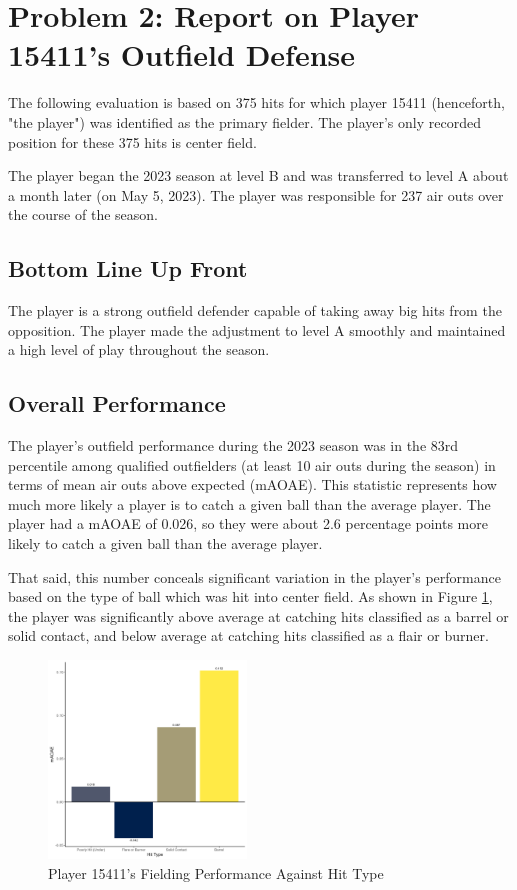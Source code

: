 
\section*{Problem 2: Report on Player 15411's Outfield Defense}
\label{sec:expts}

The following evaluation is based on 375 hits for which player 15411 (henceforth, "the player") was identified as the primary fielder. The player's only recorded position for these 375 hits is center field.

The player began the 2023 season at level B and was transferred to level A about a month later (on May 5, 2023). The player was responsible for 237 air outs over the course of the season.

\subsection{Bottom Line Up Front}

The player is a strong outfield defender capable of taking away big hits from the opposition. The player made the adjustment to level A smoothly and maintained a high level of play throughout the season.

\subsection{Overall Performance}
\label{sec:overallperformance}

The player's outfield performance during the 2023 season was in the 83rd percentile among qualified outfielders (at least 10 air outs during the season) in terms of mean air outs above expected (mAOAE). This statistic represents how much more likely a player is to catch a given ball than the average player. The player had a mAOAE of 0.026, so they were about 2.6 percentage points more likely to catch a given ball than the average player.

That said, this number conceals significant variation in the player's performance based on the type of ball which was hit into center field. As shown in Figure \ref{fig:hittype}, the player was significantly above average at catching hits classified as a barrel or solid contact, and below average at catching hits classified as a flair or burner.

\begin{figure}[htb]
    \includegraphics[width = 0.47\textwidth]{../../output/figs/hit_type_15411.png}
    \caption{Player 15411's Fielding Performance Against Hit Type}
    \label{fig:hittype}
\end{figure}

